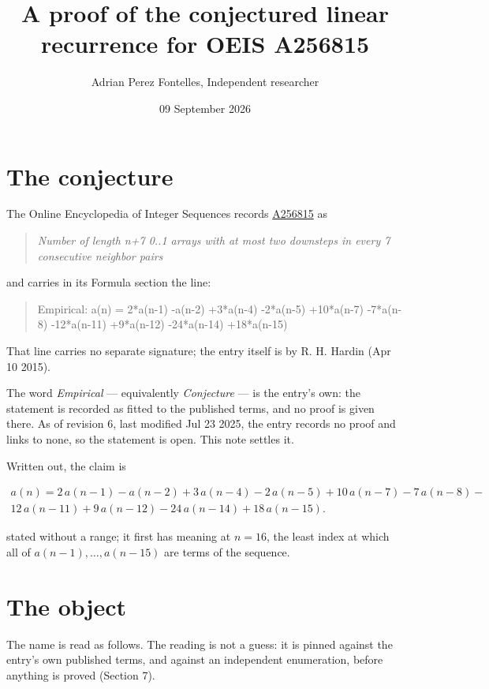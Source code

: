 \documentclass[11pt]{article}
\title{A proof of the conjectured linear recurrence for OEIS A256815}
\author{Adrian Perez Fontelles, Independent researcher}
\date{09 September 2026}
\theoremstyle{definition}
\begin{document}
\maketitle
\section{The conjecture}

The Online Encyclopedia of Integer Sequences records \href{https://oeis.org/A256815}{A256815} as

\begin{quote}\itshape Number of length n+7 0..1 arrays with at most two downsteps in every 7 consecutive neighbor pairs\end{quote}

and carries in its Formula section the line:

\begin{quote}\ttfamily Empirical: a(n) = 2*a(n-1) -a(n-2) +3*a(n-4) -2*a(n-5) +10*a(n-7) -7*a(n-8) -12*a(n-11) +9*a(n-12) -24*a(n-14) +18*a(n-15)\end{quote}

That line carries no separate signature; the entry itself is by R. H. Hardin (Apr 10 2015).

The word {\itshape Empirical} --- equivalently {\itshape Conjecture} --- is the entry's own: the statement is recorded as fitted to the published terms, and no proof is given there. As of revision 6, last modified Jul 23 2025, the entry records no proof and links to none, so the statement is open. This note settles it.

Written out, the claim is

\begin{multline*} a(n) = 2\,a(n-1) - a(n-2) + 3\,a(n-4) - 2\,a(n-5) + 10\,a(n-7) - 7\,a(n-8) - \\ 12\,a(n-11) + 9\,a(n-12) - 24\,a(n-14) + 18\,a(n-15). \end{multline*}

stated without a range; it first has meaning at $n = 16$, the least index at which all of $a(n-1),\dots,a(n-15)$ are terms of the sequence.

\section{The object}

The name is read as follows. The reading is not a guess: it is pinned against the entry's own published terms, and against an independent enumeration, before anything is proved (Section 7).
\end{document}
